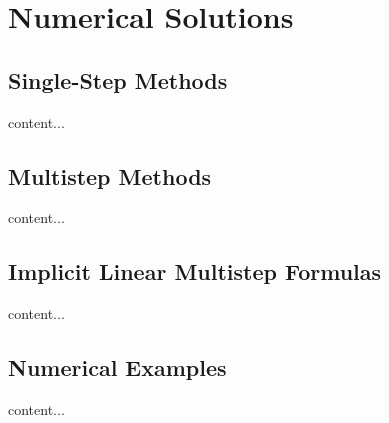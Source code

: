 \section{Numerical Solutions}
	\subsection{Single-Step Methods}
	\begin{frame}
		content...
	\end{frame}
	\subsection{Multistep Methods}
	\begin{frame}
		content...
	\end{frame}
	\subsection{Implicit Linear Multistep Formulas}
	\begin{frame}
		content...
	\end{frame}
	\subsection{Numerical Examples}
	\begin{frame}
		content...
	\end{frame}